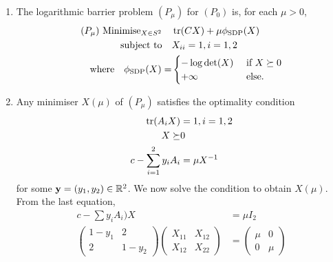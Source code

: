 \begin{enumerate}
\begin{enumerate}[label=(\alph*)]
\begin{minipage}[t]{0.45\textwidth}
                    \end{minipage}
              \item The logarithmic barrier problem \((P_\mu)\) for \((P_0)\) is, for each \(\mu > 0\),
                    \begin{align*}
                        (P_\mu) \text{ Minimise}_{X \in S^2} \quad & \tr(CX) + \mu\phi_{\operatorname{SDP}}(X) \\
                        \text{subject to} \quad                    & X_{ii} = 1, i = 1, 2        \\
                        \text{where} \quad \phi_{\operatorname{SDP}}(X) =        & \begin{cases}
                            -\log \det(X) & \text{ if } X \succeq 0 \\
                            +\infty       & \text{ else.}
                        \end{cases}
                    \end{align*}
              \item Any minimiser \(X(\mu)\) of \((P_\mu)\) satisfies the optimality condition
                    \begin{align*}
                        \tr(A_i X)                 & = 1, i = 1, 2 \\
                        X \succeq                  & 0             \\
                        c - \sum_{i = 1}^2 y_i A_i & = \mu X^{-1}
                    \end{align*}
                    for some \(\mathbf{y} = (y_1, y_2) \in \mathbb{R}^2\). We now solve the condition to obtain \(X(\mu)\). From the last equation,
                    \begin{align*}
                        c - \sum y_iA_i) X                                   & = \mu I_2                    \\
                        \begin{pmatrix}
                            1 - y_1 & 2       \\
                            2       & 1 - y_2
                        \end{pmatrix}\begin{pmatrix}
                            X_{11} & X_{12} \\
                            X_{12} & X_{22}
                        \end{pmatrix} & = \begin{pmatrix}
                            \mu & 0 \\ 0 & \mu

\end{pmatrix}
\end{align*}
\end{enumerate}
\end{enumerate}

